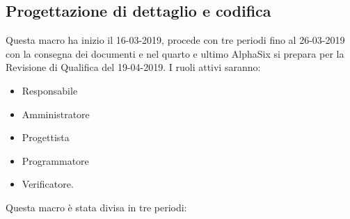         \subsection{Progettazione di dettaglio e codifica}
        Questa macro ha inizio il 16-03-2019, procede con tre periodi fino al 26-03-2019 con la consegna dei documenti e nel
        quarto e ultimo AlphaSix si prepara per la Revisione di Qualifica del 19-04-2019. I ruoli attivi saranno: 
        \begin{itemize}
            \item Responsabile
            \item Amministratore
            \item Progettista
            \item Programmatore
            \item Verificatore.
        \end{itemize}
        Questa macro è stata divisa in tre periodi:
